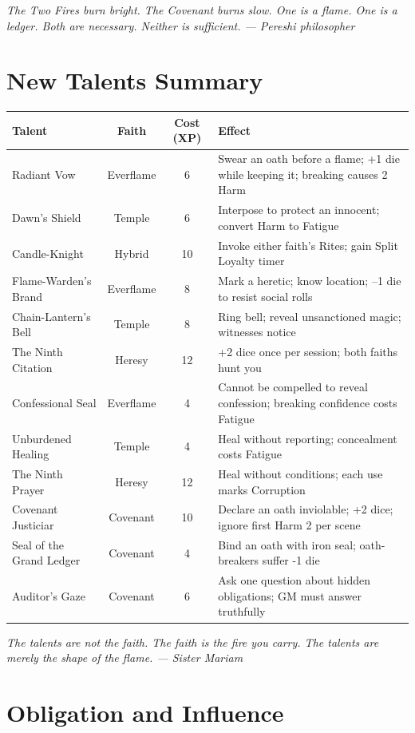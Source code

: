 \documentclass{book}
\newcommand{\citation}[1]{\textcolor{marginalia}{\small\textit{#1}}}
\begin{document}
\citation{The Two Fires burn bright. The Covenant burns slow. One is a flame. One is a ledger. Both are necessary. Neither is sufficient. --- Pereshi philosopher}

\chapter{New Talents Summary}

\begin{tabularx}{\textwidth}{X c c X}
\toprule
\textbf{Talent} & \textbf{Faith} & \textbf{Cost (XP)} & \textbf{Effect} \\
\midrule
Radiant Vow & Everflame & 6 & Swear an oath before a flame; +1 die while keeping it; breaking causes 2 Harm \\
Dawn's Shield & Temple & 6 & Interpose to protect an innocent; convert Harm to Fatigue \\
Candle-Knight & Hybrid & 10 & Invoke either faith's Rites; gain Split Loyalty timer \\
Flame-Warden's Brand & Everflame & 8 & Mark a heretic; know location; --1 die to resist social rolls \\
Chain-Lantern's Bell & Temple & 8 & Ring bell; reveal unsanctioned magic; witnesses notice \\
The Ninth Citation & Heresy & 12 & +2 dice once per session; both faiths hunt you \\
Confessional Seal & Everflame & 4 & Cannot be compelled to reveal confession; breaking confidence costs Fatigue \\
Unburdened Healing & Temple & 4 & Heal without reporting; concealment costs Fatigue \\
The Ninth Prayer & Heresy & 12 & Heal without conditions; each use marks Corruption \\
Covenant Justiciar & Covenant & 10 & Declare an oath inviolable; +2 dice; ignore first Harm 2 per scene \\
Seal of the Grand Ledger & Covenant & 4 & Bind an oath with iron seal; oath-breakers suffer -1 die \\
Auditor's Gaze & Covenant & 6 & Ask one question about hidden obligations; GM must answer truthfully \\
\bottomrule
\end{tabularx}

\citation{The talents are not the faith. The faith is the fire you carry. The talents are merely the shape of the flame. --- Sister Mariam}

\chapter{Obligation and Influence}
\end{document}
